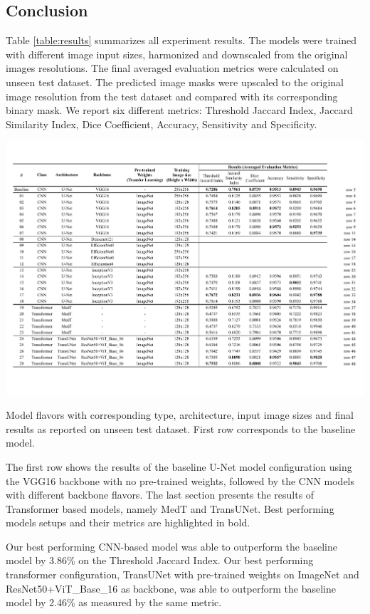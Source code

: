 \subsection{Conclusion}

Table \ref{table:results} summarizes all experiment results. The models were trained with different image input sizes, harmonized and downscaled from the original images resolutions. The final averaged evaluation metrics were calculated on unseen test dataset. The predicted image masks were upscaled to the original image resolution from the test dataset and compared with its corresponding binary mask. We report six different metrics: Threshold Jaccard Index, Jaccard Similarity Index, Dice Coefficient, Accuracy, Sensitivity and Specificity.

\begin{table}[ht]
  \centering
  \includegraphics[width=\textwidth]{assets/results.pdf}
  \caption[Results]{Model flavors with corresponding type, architecture, input image sizes and final results as reported on unseen test dataset. First row corresponds to the baseline model.}
  \label{table:results}
\end{table}

The first row shows the results of the baseline U-Net model configuration using the VGG16 backbone with no pre-trained weights, followed by the CNN models with different backbone  flavors. The last section presents the results of Transformer based models, namely MedT and TransUNet. Best performing models setups and their metrics are highlighted in bold.

\par
Our best performing CNN-based model was able to outperform the baseline model by 3.86\% on the Threshold Jaccard Index. Our best performing transformer configuration, TransUNet with pre-trained weights on ImageNet and ResNet50+ViT\_Base\_16 as backbone, was able to outperform the baseline model by 2.46\% as measured by the same metric.

